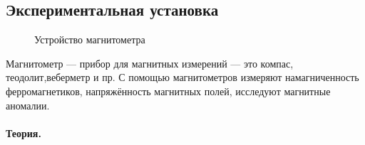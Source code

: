 \documentclass[a4paper, 12pt]{article}
\begin{document}
\subsection*{Экспериментальная установка}
\begin{figure}[h]
	\begin{minipage}[h]{0.5\linewidth}
	\end{minipage}
	\begin{minipage}[h]{0.5\linewidth}
	\end{minipage}
	\caption{Устройство магнитометра}
	\label{ris:station}
\end{figure}
Магнитометр — прибор для магнитных измерений — это компас, теодолит,веберметр и пр. С помощью магнитометров измеряют намагниченность ферромагнетиков, напряжённость магнитных полей, исследуют магнитные аномалии.\\

\paragraph{Теория. } 
\end{document}
